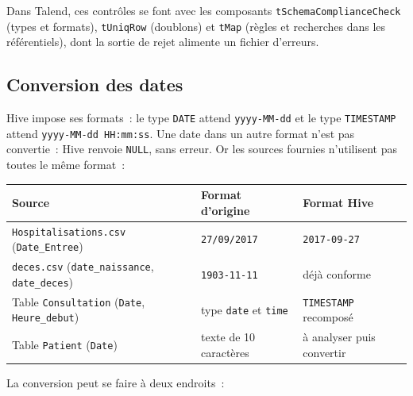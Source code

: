 \noindent Dans Talend, ces contrôles se font avec les composants \texttt{tSchemaComplianceCheck} (types et formats), \texttt{tUniqRow} (doublons) et \texttt{tMap} (règles et recherches dans les référentiels), dont la sortie de rejet alimente un fichier d'erreurs.

\subsection{Conversion des dates}

\noindent Hive impose ses formats~: le type \texttt{DATE} attend \texttt{yyyy-MM-dd} et le type \texttt{TIMESTAMP} attend \texttt{yyyy-MM-dd HH:mm:ss}. Une date dans un autre format n'est pas convertie~: Hive renvoie \texttt{NULL}, sans erreur. Or les sources fournies n'utilisent pas toutes le même format~:

\begin{center}
\begin{tabularx}{\textwidth}{>{\raggedright\arraybackslash}X l l}
\toprule
\textbf{Source} & \textbf{Format d'origine} & \textbf{Format Hive} \\
\midrule
\texttt{Hospitalisations.csv} (\texttt{Date\_Entree}) & \texttt{27/09/2017} & \texttt{2017-09-27} \\
\texttt{deces.csv} (\texttt{date\_naissance}, \texttt{date\_deces}) & \texttt{1903-11-11} & déjà conforme \\
Table \texttt{Consultation} (\texttt{Date}, \texttt{Heure\_debut}) & type \texttt{date} et \texttt{time} & \texttt{TIMESTAMP} recomposé \\
Table \texttt{Patient} (\texttt{Date}) & texte de 10 caractères & à analyser puis convertir \\
\bottomrule
\end{tabularx}
\end{center}

\noindent La conversion peut se faire à deux endroits~:

